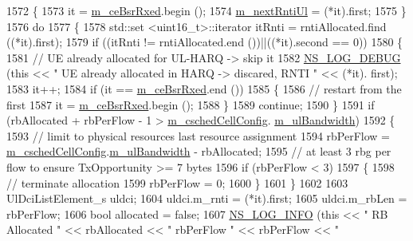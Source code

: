 \begin{DoxyCode}
1572     \{
1573       it = \hyperlink{classns3_1_1TtaFfMacScheduler_a6b88fda6059c5679b747c2e1856729b1}{m\_ceBsrRxed}.begin ();
1574       \hyperlink{classns3_1_1TtaFfMacScheduler_a4342a2e63a980d852d3cb6ef1e77197b}{m\_nextRntiUl} = (*it).first;
1575     \}
1576   \textcolor{keywordflow}{do}
1577     \{
1578       std::set <uint16\_t>::iterator itRnti = rntiAllocated.find ((*it).first);
1579       \textcolor{keywordflow}{if} ((itRnti != rntiAllocated.end ())||((*it).second == 0))
1580         \{
1581           \textcolor{comment}{// UE already allocated for UL-HARQ -> skip it}
1582           \hyperlink{group__logging_ga413f1886406d49f59a6a0a89b77b4d0a}{NS\_LOG\_DEBUG} (\textcolor{keyword}{this} << \textcolor{stringliteral}{" UE already allocated in HARQ -> discared, RNTI "} << (*it).
      first);
1583           it++;
1584           \textcolor{keywordflow}{if} (it == \hyperlink{classns3_1_1TtaFfMacScheduler_a6b88fda6059c5679b747c2e1856729b1}{m\_ceBsrRxed}.end ())
1585             \{
1586               \textcolor{comment}{// restart from the first}
1587               it = \hyperlink{classns3_1_1TtaFfMacScheduler_a6b88fda6059c5679b747c2e1856729b1}{m\_ceBsrRxed}.begin ();
1588             \}
1589           \textcolor{keywordflow}{continue};
1590         \}
1591       \textcolor{keywordflow}{if} (rbAllocated + rbPerFlow - 1 > \hyperlink{classns3_1_1TtaFfMacScheduler_af263a06ea69ff1d096ddb48df0ac7f81}{m\_cschedCellConfig}.
      \hyperlink{structns3_1_1FfMacCschedSapProvider_1_1CschedCellConfigReqParameters_a5ab5b102878e6e7e7727a14af4a64d2f}{m\_ulBandwidth})
1592         \{
1593           \textcolor{comment}{// limit to physical resources last resource assignment}
1594           rbPerFlow = \hyperlink{classns3_1_1TtaFfMacScheduler_af263a06ea69ff1d096ddb48df0ac7f81}{m\_cschedCellConfig}.\hyperlink{structns3_1_1FfMacCschedSapProvider_1_1CschedCellConfigReqParameters_a5ab5b102878e6e7e7727a14af4a64d2f}{m\_ulBandwidth} - rbAllocated;
1595           \textcolor{comment}{// at least 3 rbg per flow to ensure TxOpportunity >= 7 bytes}
1596           \textcolor{keywordflow}{if} (rbPerFlow < 3)
1597             \{
1598               \textcolor{comment}{// terminate allocation}
1599               rbPerFlow = 0;      
1600             \}
1601         \}
1602 
1603       UlDciListElement\_s uldci;
1604       uldci.m\_rnti = (*it).first;
1605       uldci.m\_rbLen = rbPerFlow;
1606       \textcolor{keywordtype}{bool} allocated = \textcolor{keyword}{false};
1607       \hyperlink{group__logging_gafbd73ee2cf9f26b319f49086d8e860fb}{NS\_LOG\_INFO} (\textcolor{keyword}{this} << \textcolor{stringliteral}{" RB Allocated "} << rbAllocated << \textcolor{stringliteral}{" rbPerFlow "} << rbPerFlow << \textcolor{stringliteral}{"
}
\end{DoxyCode}
